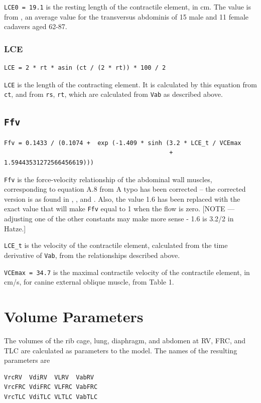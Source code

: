 \documentclass[12pt,openany,oneside]{book}
\begin{document}
\verb~LCE0 = 19.1~ is the resting length of the contractile element,
in cm.  The value is from \citet{springerlink:10.1007/BF01576742}, an
average value for the transversus abdominis of 15 male and 11 female
cadavers aged 62-87.

\subsubsection{LCE}
\begin{verbatim}
LCE = 2 * rt * asin (ct / (2 * rt)) * 100 / 2
\end{verbatim}
\verb~LCE~ is the length of the contracting element.  It is calculated
by this equation from \verb~ct~, and from \verb~rs~, \verb~rt~, which
are calculated from \verb~Vab~ as described above.

\subsection{\texttt{Ffv}}
\begin{verbatim}
Ffv = 0.1433 / (0.1074 +  exp (-1.409 * sinh (3.2 * LCE_t / VCEmax
                                              + 1.59443531272566456619)))
\end{verbatim}
\verb~Ffv~ is the force-velocity relationship of the abdominal wall
muscles, corresponding to equation A.8 from \citet{Ratnovsky20031771}
A typo has been corrected -- the corrected version is as found in
\citet{1545509}, \citet{Rosen1999415}, and \citet{Hatze1981}.  Also,
the value 1.6 has been replaced with the exact value that will make
\verb~Ffv~ equal to 1 when the flow is zero. [NOTE --- adjusting one
of the other constants may make more sense - 1.6 is 3.2/2 in Hatze.]

\verb~LCE_t~ is the velocity of the contractile element, calculated
from the time derivative of \verb~Vab~, from the relationships
described above.

\verb~VCEmax = 34.7~ is the maximal contractile velocity of the
contractile element, in cm/s, for canine external oblique muscle, from
\citet{Ratnovsky20031771} Table 1.

\section{Volume Parameters}
\label{Volume Parameters}

The volumes of the rib cage, lung, diaphragm, and abdomen at RV, FRC,
and TLC are calculated as parameters to the model.  The names of the
resulting parameters are
\begin{verbatim}
VrcRV  VdiRV  VLRV  VabRV 
VrcFRC VdiFRC VLFRC VabFRC
VrcTLC VdiTLC VLTLC VabTLC
\end{verbatim}
\end{document}
